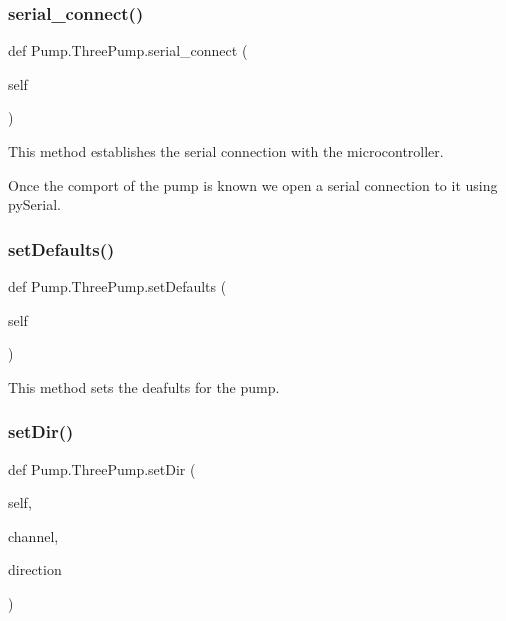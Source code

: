 \subsubsection{\texorpdfstring{serial\_connect()}{serial\_connect()}}
{\footnotesize\ttfamily def Pump.\+Three\+Pump.\+serial\+\_\+connect (\begin{DoxyParamCaption}\item[{}]{self }\end{DoxyParamCaption})}

\begin{DoxyVerb}This method establishes the serial connection with the microcontroller.

Once the comport of the pump is known we open a serial connection to it using pySerial.
\end{DoxyVerb}
 \mbox{\label{class_pump_1_1_three_pump_aa8bd3a756f024e4db902de68584ed1ee}} 
\subsubsection{\texorpdfstring{setDefaults()}{setDefaults()}}
{\footnotesize\ttfamily def Pump.\+Three\+Pump.\+set\+Defaults (\begin{DoxyParamCaption}\item[{}]{self }\end{DoxyParamCaption})}

\begin{DoxyVerb}This method sets the deafults for the pump.
\end{DoxyVerb}
 \mbox{\label{class_pump_1_1_three_pump_a1aaeb98ffd09c015ee68ada56fc76b13}} 
\subsubsection{\texorpdfstring{setDir()}{setDir()}}
{\footnotesize\ttfamily def Pump.\+Three\+Pump.\+set\+Dir (\begin{DoxyParamCaption}\item[{}]{self,  }\item[{}]{channel,  }\item[{}]{direction }\end{DoxyParamCaption})}

